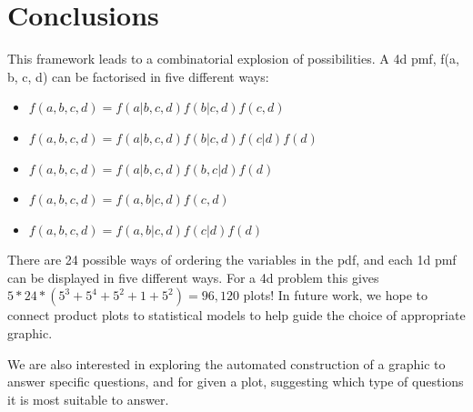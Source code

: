 \documentclass[journal]{vgtc}
\begin{document}
% 
% 
% 
% 

\section{Conclusions}

This framework leads to a combinatorial explosion of possibilities. A 4d pmf, f(a, b, c, d) can be factorised in five different ways:

\begin{itemize}
  \item $f(a, b, c, d) = f(a | b, c, d) f(b | c, d) f(c, d)$
  \item $f(a, b, c, d) = f(a | b, c, d) f(b | c, d) f(c | d) f(d)$
  \item $f(a, b, c, d) = f(a | b, c, d) f(b, c | d) f(d)$
  \item $f(a, b, c, d) = f(a, b | c, d) f(c, d)$
  \item $f(a, b, c, d) = f(a, b | c, d) f(c | d) f(d)$
\end{itemize}

\noindent There are 24 possible ways of ordering the variables in the pdf, and each 1d pmf can be displayed in five different ways. For a 4d problem this gives $5 * 24 * (5^3 + 5^4 + 5^2 + 1 + 5^2) = 96,120$ plots! In future work, we hope to connect product plots to statistical models to help guide the choice of appropriate graphic.

We are also interested in exploring the automated construction of a graphic to answer specific questions, and for given a plot, suggesting which type of questions it is most suitable to answer.




\end{document}
